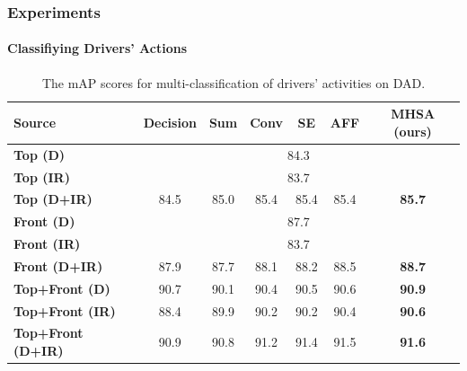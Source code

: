 \begin{frame}
\frametitle{Experiments}
\framesubtitle{Classifiying Drivers' Actions}

\begin{table}[]
\begin{tabular}{l|cccccc}
\hline
\textbf{Source}        & \textbf{Decision} & \textbf{Sum} & \textbf{Conv} & \textbf{SE} & \textbf{AFF} & \textbf{MHSA (ours)}                  \\ \hline
\textbf{Top (D)}       & \multicolumn{6}{c}{84.3}                                                                                              \\
\textbf{Top (IR)}      & \multicolumn{6}{c}{83.7}                                                                                              \\
\textbf{Top (D+IR)} &
    84.5 &
    85.0 &
    85.4 &
    85.4 &
    85.4 &
    \textbf{85.7} \\ \hline
\textbf{Front (D)}     & \multicolumn{6}{c}{87.7}                                                                                              \\
\textbf{Front (IR)}    & \multicolumn{6}{c}{83.7}                                                                                              \\
\textbf{Front (D+IR)} &
    87.9 &
    87.7 &
    88.1 &
    88.2 &
    88.5 &
    \textbf{88.7} \\ \hline
\textbf{Top+Front (D)} & 90.7              & 90.1         & 90.4          & 90.5        & 90.6         & \textbf{90.9} \\
\textbf{Top+Front (IR)} &
    88.4 &
    89.9 &
    90.2 &
    90.2 &
    90.4 &
    \textbf{90.6} \\
\textbf{Top+Front (D+IR)} &
    90.9 &
    90.8 &
    91.2 &
    91.4 &
    91.5 &
    {\textbf{91.6}} \\ \hline
\end{tabular}%
\caption{The mAP scores for multi-classification of drivers' activities on DAD.}
\label{tab:2}
\end{table}

\end{frame}

